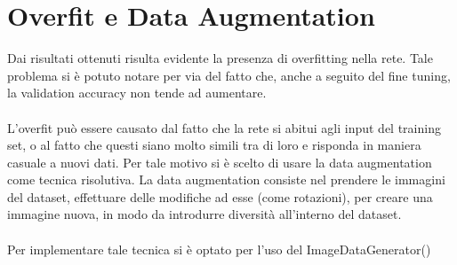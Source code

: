 \section{Overfit e Data Augmentation}
Dai risultati ottenuti risulta evidente la presenza di overfitting nella rete.
Tale problema si è potuto notare per via del fatto che, anche a seguito del fine tuning, la validation accuracy non tende 
ad aumentare.
\\\\
L'overfit può essere causato dal fatto che la rete si abitui agli input del training set, o al 
fatto che questi siano molto simili tra di loro e risponda in maniera casuale a nuovi dati. Per tale motivo si è scelto di usare la data augmentation come tecnica risolutiva.
La data augmentation consiste nel prendere le immagini del dataset, effettuare delle modifiche ad esse (come rotazioni), per 
creare una immagine nuova, in modo da introdurre diversità all'interno del dataset. 
\\\\
Per implementare tale tecnica si è optato per l'uso del ImageDataGenerator()